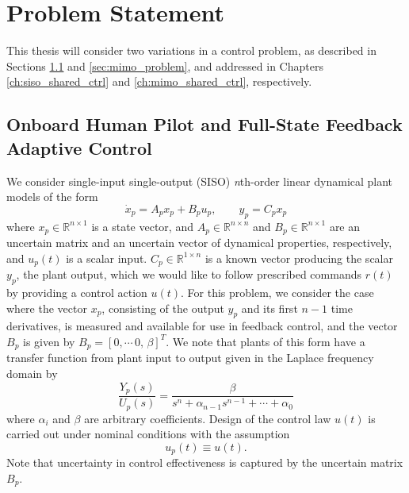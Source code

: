 \chapter{Problem Statement} \label{ch:problem}

This thesis will consider two variations in a control problem, as described in Sections \ref{sec:siso_problem} and \ref{sec:mimo_problem}, and addressed in Chapters \ref{ch:siso_shared_ctrl} and \ref{ch:mimo_shared_ctrl}, respectively.

\section{Onboard Human Pilot and Full-State Feedback Adaptive Control} \label{sec:siso_problem}

We consider single-input single-output (SISO) \textit{n}th-order linear dynamical plant models of the form 
\begin{equation}
\dot x_p = A_p x_p + B_p u_p	, \qquad y_p = C_p x_p \label{eq:siso_plant}
\end{equation} 
\noindent where $x_p \in \mathbb{R}^{n \times 1}$ is a state vector, and $A_p \in \mathbb{R}^{n \times n}$ and $B_p \in \mathbb{R}^{n \times 1}$ are an uncertain matrix and an uncertain vector of dynamical properties, respectively, and $u_p(t)$ is a scalar input. $C_p \in \mathbb{R}^{1 \times n}$ is a known vector producing the scalar $y_p$, the plant output, which we would like to follow prescribed commands $r(t)$ by providing a control action $u(t)$. For this problem, we consider the case where the vector $x_p$, consisting of the output $y_p$ and its first $n-1$ time derivatives, is measured and available for use in feedback control, and the vector $B_p$ is given by $B_p = [0, \cdots \, 0, \, \beta]^T$. We note that plants of this form have a transfer function from plant input to output given in the Laplace frequency domain by
\begin{equation}
\frac{Y_p(s)}{U_p(s)} = \frac{\beta}{s^n + \alpha_{n-1} s^{n-1} + \cdots + \alpha_0}	
\end{equation}
where $\alpha_i$ and $\beta$ are arbitrary coefficients. Design of the control law $u(t)$ is carried out under nominal conditions with the assumption
\begin{equation}
	u_p(t) \equiv u(t). \label{eq:siso_plant_input_nom}
\end{equation} %
Note that uncertainty in control effectiveness is captured by the uncertain matrix $B_p$. 


